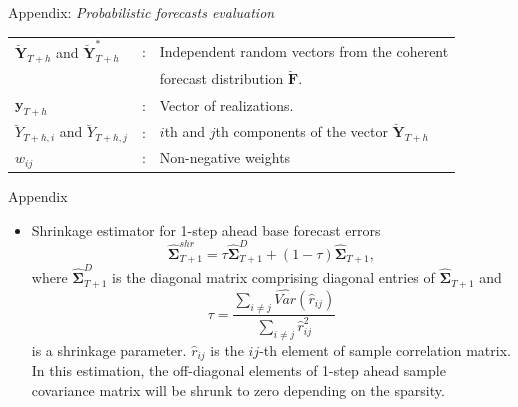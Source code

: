 \documentclass[11pt,xcolor=dvipsnames,table]{beamer} %
\begin{document}
\begin{frame}[noframenumbering]{Appendix: \textit{Probabilistic forecasts evaluation}}
\begin{itemize}
	\begin{table}
		\small
		\centering %
		\begin{tabular}{lll}
			\toprule
			$\breve{\bm{Y}}_{T+h}$ and $\breve{\bm{Y}}^*_{T+h}$ & : & Independent random vectors from the coherent \\
			& & forecast distribution $\breve{\bm{F}}$.\\
			$\bm{y}_{T+h}$ & : &Vector of realizations. \\
			$\breve{Y}_{T+h,i}$ and $\breve{Y}_{T+h,j}$ & : & $i$th and $j$th components of the vector $\breve{\bm{Y}}_{T+h}$ \\
			$w_{ij}$ & : & Non-negative weights\\
			\bottomrule
		\end{tabular}
	\end{table}
	
\end{itemize}

\end{frame}


\begin{frame}[noframenumbering]{Appendix}
\begin{itemize}
	\item \hypertarget{Shrinkage}{} Shrinkage estimator for 1-step ahead base forecast errors
	$$
	\hat{\bm{\Sigma}}_{T+1}^{shr} = \tau\hat{\bm{\Sigma}}_{T+1}^D + (1-\tau)\hat{\bm{\Sigma}}_{T+1},
	$$
	where $\hat{\bm{\Sigma}}_{T+1}^D$ is the diagonal matrix comprising diagonal entries of $\hat{\bm{\Sigma}}_{T+1}$ and $$\tau = \frac{\sum_{i \ne j}\hat{Var}(\hat{r}_{ij})}{\sum_{i \ne j}\hat{r}_{ij}^2}$$ is a shrinkage parameter. $\hat{r}_{ij}$ is the $ij$-th element of sample correlation matrix.  In this estimation, the off-diagonal elements of 1-step ahead sample covariance matrix will be shrunk to zero depending on the sparsity.
	
\end{itemize}
\end{frame}
\end{document}
